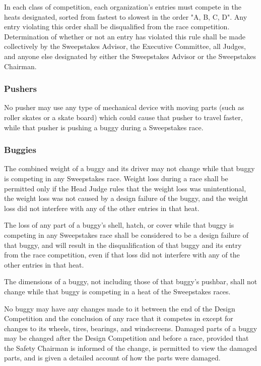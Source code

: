 	In each class of competition, each organization's entries must compete in the
	heats designated, sorted from fastest to slowest in the order "A, B, C, D". 
	Any entry violating this order shall be disqualified from the race competition. 
	Determination of whether or not an entry has violated this rule shall be made 
	collectively by the Sweepstakes Advisor, the Executive Committee, all Judges,
	and anyone else designated by either the Sweepstakes Advisor or the Sweepstakes 
	Chairman.

\subsubsection{Pushers}

	No pusher may use any type of mechanical device with moving parts (such as
	roller skates or a skate board) which could cause that pusher to travel faster,
	while that pusher is pushing a buggy during a Sweepstakes race.

\subsubsection{Buggies}

	The combined weight of a buggy and its driver may not change while that buggy
	is competing in any Sweepstakes race. Weight loss during a race shall be
	permitted only if the Head Judge rules that the weight loss was unintentional,
	the weight loss was not caused by a design failure of the buggy, and the weight
	loss did not interfere with any of the other entries in that heat.

	The loss of any part of a buggy's shell, hatch, or cover while that buggy is
	competing in any Sweepstakes race shall be considered to be a design failure of
	that buggy, and will result in the disqualification of that buggy and its entry
	from the race competition, even if that loss did not interfere with any of the
	other entries in that heat.

	The dimensions of a buggy, not including those of that buggy's pushbar, shall
	not change while that buggy is competing in a heat of the Sweepstakes races.

	No buggy may have any changes made to it between the end of the Design
	Competition and the conclusion of any race that it competes in except for
	changes to its wheels, tires, bearings, and windscreens. Damaged parts of a
	buggy may be changed after the Design Competition and before a race, provided
	that the Safety Chairman is informed of the change, is permitted to view the
	damaged parts, and is given a detailed account of how the parts were damaged.

